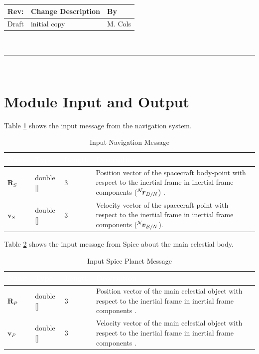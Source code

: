 \documentclass[]{AVSSimReportMemo}
\begin{document}
\makeCover


%
%
\pagestyle{empty}
{\renewcommand{\arraystretch}{2}
\noindent
\begin{longtable}{|p{0.5in}|p{4.5in}|p{1.14in}|}
\hline
{\bfseries Rev}: & {\bfseries Change Description} & {\bfseries By} \\
\hline
Draft & initial copy & M. Cols \\
\hline

\end{longtable}
}

\newpage
\setcounter{page}{1}
\pagestyle{fancy}

\tableofcontents
~\\ \hrule ~\\

\section{Module Input and Output}
Table \ref{tab:inputNavTable} shows the input message from the navigation system.
\begin{table}[h!]
	\centering
	\caption{Input Navigation Message}
	\begin{tabular}{|l|l|l|p{3in}|}
		\hline
		\rowcolor{BrickRed}
		\textcolor{white}{Name} & \textcolor{white}{Type} &
		\textcolor{white}{Length} &
		\textcolor{white}{Description}  \\ \hline
		$\bm{R}_S$ & double [] & 3 &
		Position vector of the spacecraft body-point with respect to the inertial frame in inertial frame components
		($\leftexp{N}{\bm{r}}_{B/N}$) . \\ \hline
		$\bm{v}_S$ & double [] & 3 &
		Velocity vector of the spacecraft point with respect to the inertial frame in inertial frame components
		($\leftexp{N}{\bm{v}}_{B/N}$). \\ \hline
	\end{tabular}
	\label{tab:inputNavTable}
\end{table}

Table \ref{tab:inputCelTable} shows the input message from Spice about the main celestial body.
\begin{table}[h!]
	\centering
	\caption{Input Spice Planet Message}
	\begin{tabular}{|l|l|l|p{3in}|}
		\hline
		\rowcolor{BrickRed}
		\textcolor{white}{Name} & \textcolor{white}{Type} &
		\textcolor{white}{Length} &
		\textcolor{white}{Description}  \\ \hline
		$\bm{R}_P$  & double [] & 3 &
		Position vector of the main celestial object with respect to the inertial frame in inertial frame components . \\ \hline
		$\bm{v}_P$  & double [] & 3 &
		Velocity vector of the main celestial object with respect to the inertial frame in inertial frame components . \\ \hline
	\end{tabular}
	\label{tab:inputCelTable}
\end{table}
\end{document}
